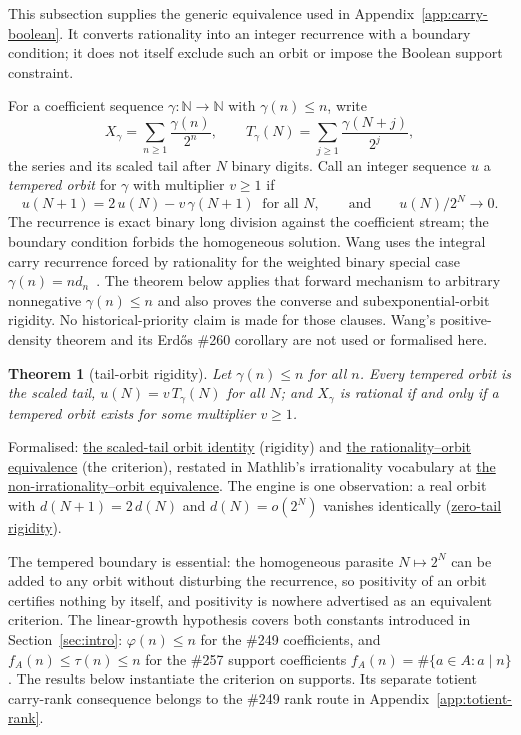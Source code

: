 \documentclass[11pt]{article}
\newcommand{\commit}{99f4bf47422abbd8757cbb22b50ba079d764d3a7}
\newcommand{\repobase}{https://github.com/wcook04/plectis-erdos/blob/\commit}
\newcommand{\PK}{Erdos249257}
\newcommand{\lword}[4]{\href{\repobase/\PK/#1\#L#2}{#4}}
\newtheorem{theorem}{Theorem}[section]
\theoremstyle{definition}
\theoremstyle{remark}
\newcommand{\N}{\mathbb{N}}
\newcommand{\ph}{\varphi}
\begin{document}
This subsection supplies the generic equivalence used in
Appendix~\ref{app:carry-boolean}.
It converts rationality into an integer recurrence with a boundary condition;
it does not itself exclude such an orbit or impose the Boolean support
constraint.

For a coefficient sequence $\gamma:\N\to\N$ with $\gamma(n)\le n$, write
\[
X_\gamma=\sum_{n\ge1}\frac{\gamma(n)}{2^n},
\qquad
T_\gamma(N)=\sum_{j\ge1}\frac{\gamma(N+j)}{2^j},
\]
the series and its scaled tail after $N$ binary digits. Call an integer
sequence $u$ a \emph{tempered orbit} for $\gamma$ with multiplier $v\ge1$ if
\[
u(N+1)=2\,u(N)-v\,\gamma(N+1)\ \text{ for all } N,
\qquad\text{and}\qquad
u(N)/2^N\to0 .
\]
The recurrence is exact binary long division against the coefficient stream;
the boundary condition forbids the homogeneous solution. Wang uses the
integral carry recurrence forced by rationality for the weighted binary
special case
$\gamma(n)=n d_n$~\cite[Proposition~3.1, pp.~5--6]{wang2026}. The theorem below applies that
forward mechanism to arbitrary nonnegative $\gamma(n)\le n$ and also proves
the converse and subexponential-orbit rigidity.  No historical-priority claim
is made for those clauses. Wang's positive-density theorem and its Erd\H{o}s
\#260 corollary are not used or formalised here.

\begin{theorem}[tail-orbit rigidity]\label{res:rigidity}
Let $\gamma(n)\le n$ for all $n$. Every tempered orbit is the scaled tail,
$u(N)=v\,T_\gamma(N)$ for all $N$; and $X_\gamma$ is rational if and only if a tempered
orbit exists for some multiplier $v\ge1$.
\end{theorem}
\noindent Formalised:
\lword{GenericTailOrbitRigidity.lean}{339}{temperedBinaryOrbit_eq_scaledTail}{the scaled-tail orbit identity}
(rigidity) and
\lword{GenericTailOrbitRigidity.lean}{426}{binaryCoeffSeries_rational_iff_exists_temperedBinaryOrbit}{the rationality--orbit equivalence}
(the criterion), restated in Mathlib's irrationality vocabulary at
\lword{GenericTailOrbitRigidity.lean}{435}{not_irrational_binaryCoeffSeries_iff_exists_temperedBinaryOrbit}{the non-irrationality--orbit equivalence}.
The engine is one observation: a real orbit with $d(N+1)=2\,d(N)$ and
$d(N)=o(2^N)$ vanishes identically
(\lword{GenericTailOrbitRigidity.lean}{315}{doublingOrbit_eq_zero_of_tempered}{zero-tail rigidity}).

The tempered boundary is essential: the
homogeneous parasite $N\mapsto2^N$ can be added to any orbit without
disturbing the recurrence, so positivity of an orbit certifies nothing by
itself, and positivity is nowhere advertised as an equivalent criterion. The
linear-growth hypothesis covers both constants introduced in
Section~\ref{sec:intro}:
$\ph(n)\le n$ for the \#249 coefficients, and $f_A(n)\le\tau(n)\le n$ for the
\#257 support coefficients $f_A(n)=\#\{a\in A:a\mid n\}$.  The results below
instantiate the criterion on supports.  Its separate totient
carry-rank consequence belongs to the \#249 rank route in
Appendix~\ref{app:totient-rank}.
\end{document}
